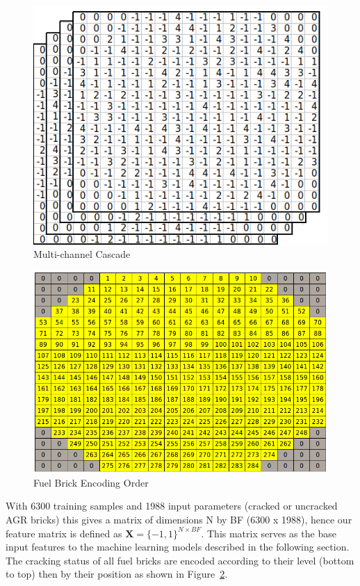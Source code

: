 \begin{figure}[t]
	\centering
	\includegraphics[scale=0.45]{Figures/InputCascade.png}
	\caption{Multi-channel Cascade}
	\label{fig:cascade}
\end{figure}

\begin{figure}[t]
	\centering
	\includegraphics[scale=0.35]{Figures/fuel_channel_numbers.png}
	\caption{Fuel Brick Encoding Order}
	\label{fig:order}
\end{figure}


\noindent
With 6300 training samples and 1988 input parameters (cracked or uncracked AGR bricks) this gives a matrix of dimensions N by BF (6300 x 1988), hence our feature matrix is defined as $\textbf{X} = \{-1, 1\}^{N \times BF}$. This matrix serves as the base input features to the machine learning models described in the following section. The cracking status of all fuel bricks are encoded according to their level (bottom to top) then by their position as shown in Figure~\ref{fig:order}.
\\

